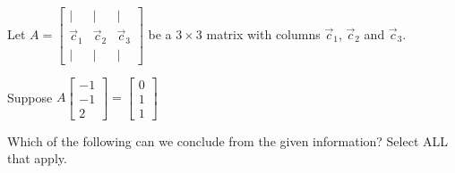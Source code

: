 \documentclass{ximera}
\author{}
\begin{document}
\begin{exercise}
Let $A=\begin{bmatrix}|&|&|\\\vec{c}_1& \vec{c}_2 & \vec{c}_3\\|&|&|\end{bmatrix}$ be a $3\times 3$ matrix with columns $\vec{c}_1$, $\vec{c}_2$ and $\vec{c}_3$.

Suppose $A\begin{bmatrix}-1\\-1\\2\end{bmatrix}=\begin{bmatrix}0\\1\\1\end{bmatrix}$

Which of the following can we conclude from the given information?  Select ALL that apply.
\begin{selectAll}
  \end{selectAll}
\end{exercise}

\end{document}
